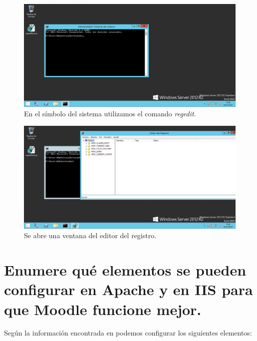 \begin{figure}[H]
	\centering
	\includegraphics[scale=0.4]{openregedit2.png}
	\caption{En el símbolo del sistema utilizamos el comando \textit{regedit}.}
\end{figure}

\begin{figure}[H]
	\centering
	\includegraphics[scale=0.4]{openregedit3.png}
	\caption{Se abre una ventana del editor del registro.}
\end{figure}

\section{Enumere qué elementos se pueden configurar en Apache y en IIS para que Moodle funcione mejor.}
Según la información encontrada en \cite{c4} podemos configurar los siguientes elementos:

